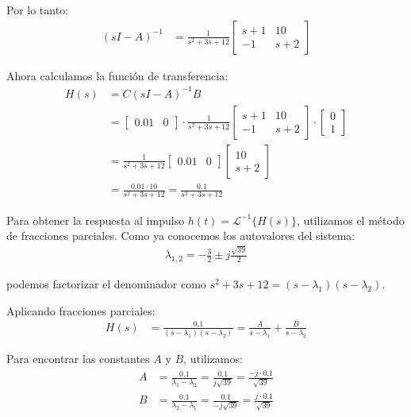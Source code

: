 \documentclass[
  11pt,
  letterpaper,
   addpoints,
   answers
  ]{exam}
\begin{document}
\begin{solution}
Por lo tanto:
\begin{align}
(sI-A)^{-1} &= \frac{1}{s^2+3s+12} \begin{bmatrix}s+1&10\\ -1&s+2\end{bmatrix}
\end{align}

Ahora calculamos la función de transferencia:
\begin{align}
H(s) &= C(sI-A)^{-1}B \\
&= \begin{bmatrix}0.01&0\end{bmatrix} \cdot \frac{1}{s^2+3s+12} \begin{bmatrix}s+1&10\\ -1&s+2\end{bmatrix} \cdot \begin{bmatrix}0\\1\end{bmatrix} \\
&= \frac{1}{s^2+3s+12} \begin{bmatrix}0.01&0\end{bmatrix} \begin{bmatrix}10\\ s+2\end{bmatrix} \\
&= \frac{0.01 \cdot 10}{s^2+3s+12} = \frac{0.1}{s^2+3s+12}
\end{align}

Para obtener la respuesta al impulso $h(t) = \mathcal{L}^{-1}\{H(s)\}$, utilizamos el método de fracciones parciales. Como ya conocemos los autovalores del sistema:
\begin{align}
\lambda_{1,2} = -\frac{3}{2} \pm j\frac{\sqrt{39}}{2}
\end{align}

podemos factorizar el denominador como $s^2+3s+12=(s-\lambda_1)(s-\lambda_2)$. 

Aplicando fracciones parciales:
\begin{align}
H(s) &= \frac{0.1}{(s-\lambda_1)(s-\lambda_2)} = \frac{A}{s-\lambda_1} + \frac{B}{s-\lambda_2}
\end{align}

Para encontrar las constantes $A$ y $B$, utilizamos:
\begin{align}
A &= \frac{0.1}{\lambda_1-\lambda_2} = \frac{0.1}{j\sqrt{39}} = \frac{-j \cdot 0.1}{\sqrt{39}} \\
B &= \frac{0.1}{\lambda_2-\lambda_1} = \frac{0.1}{-j\sqrt{39}} = \frac{j \cdot 0.1}{\sqrt{39}}
\end{align}


\end{solution}
\end{document}
